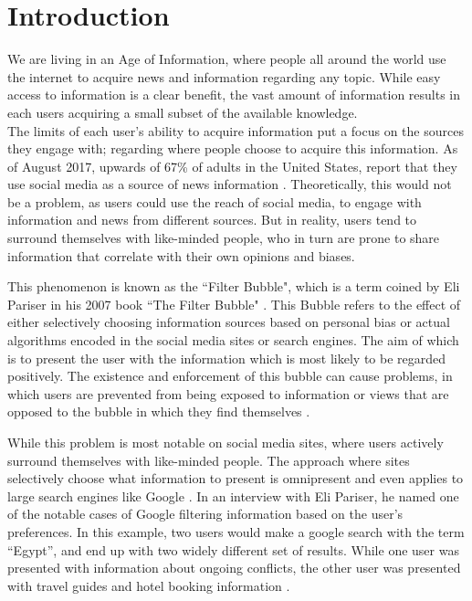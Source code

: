 \chapter{Introduction}
We are living in an Age of Information, where people all around the world use
the internet to acquire news and information regarding any topic.
While easy access to information is a clear benefit, the vast amount of
information results in each users acquiring a small subset of the available
knowledge.\\
The limits of each user's ability to acquire information put a focus on the
sources they engage with; regarding where people choose to acquire this
information.
As of August 2017, upwards of 67\% of adults in the United States, report that
they use social media as a source of news information \citep{journalism2017}.
Theoretically, this would not be a problem, as users could use the reach of
social media, to engage with information and news from different sources.
But in reality, users tend to surround themselves with like-minded people, who
in turn are prone to share information that correlate with their own opinions
and biases.\nl

This phenomenon is known as the ``Filter Bubble", which is a term coined by Eli
Pariser in his 2007 book ``The Filter Bubble" \citep{pariser2011filter}.
This Bubble refers to the effect of either selectively choosing information
sources based on personal bias or actual algorithms encoded in the social media
sites or search engines.
The aim of which is to present the user with the information which is most
likely to be regarded positively.
The existence and enforcement of this bubble can cause problems, in which users
are prevented from being exposed to information or views that are opposed to the
bubble in which they find themselves \citep[p.59-73]{pariser2011filter}.\nl

While this problem is most notable on social media sites, where users actively
surround themselves with like-minded people.
The approach where sites selectively choose what information to present is
omnipresent and even applies to large search engines like Google
\citep{filterBubbleDef}.
In an interview with Eli Pariser, he named one of the notable cases of Google
filtering information based on the user's preferences.
In this example, two users would make a google search with the term ``Egypt'',
and end up with two widely different set of results.
While one user was presented with information about ongoing conflicts, the other
user was presented with travel guides and hotel booking information
\citep{nusSduSearch}.